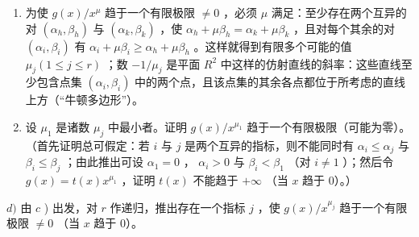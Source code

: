 \begin{enumerate}
\def\labelenumi{\alph{enumi})}
\setcounter{enumi}{1}
\item
  为使 \(g(x)/x^{\mu}\) 趋于一个有限极限 \(\neq0\) ，必须 \(\mu\) 满足：至少存在两个互异的对 \((\alpha_{h},\beta_{h})\) 与 \((\alpha_{k},\beta_{k})\) ，使 \(\alpha_{h}+\mu\beta_{h}=\alpha_{k}+\mu\beta_{k}\) ，且对每个其余的对 \((\alpha_{i},\beta_{i})\) 有 \(\alpha_{i}+\mu\beta_{i}\geqslant\alpha_{h}+\mu\beta_{h}\) 。这样就得到有限多个可能的值 \(\mu_{j}(1\leqslant j\leqslant r)\) ；数 \(-1/\mu_{j}\) 是平面 \(R^{2}\) 中这样的仿射直线的斜率：这些直线至少包含点集 \((\alpha_{i},\beta_{i})\) 中的两个点，且该点集的其余各点都位于所考虑的直线上方（“牛顿多边形”）。
\item
  设 \(\mu_{1}\) 是诸数 \(\mu_{j}\) 中最小者。证明 \(g(x) / x^{\mu_1}\) 趋于一个有限极限（可能为零）。（首先证明总可假定：若 \(i\) 与 \(j\) 是两个互异的指标，则不能同时有 \(\alpha_{i} \leqslant \alpha_{j}\) 与 \(\beta_{i} \leqslant \beta_{j}\) ；由此推出可设 \(\alpha_{1} = 0\) ， \(\alpha_{i} > 0\) 与 \(\beta_{i} < \beta_{1}\) （对 \(i \neq 1\) ）；然后令 \(g(x) = t(x)x^{\mu_1}\) ，证明 \(t(x)\) 不能趋于 \(+\infty\) （当 \(x\) 趋于 0）。）
\end{enumerate}

\(d)\) 由 \(c\) ) 出发，对 \(r\) 作递归，推出存在一个指标 \(j\) ，使 \(g(x) / x^{\mu_j}\) 趋于一个有限极限 \(\neq 0\) （当 \(x\) 趋于 0）。

\setcounter{exercisegroup}{2}
